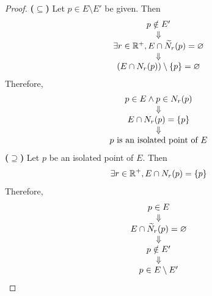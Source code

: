 \begin{proof}
    \textbf{($\subseteq$)} Let $p \in E \setminus E'$ be given. Then
    \[
    \begin{array}{c}
        p \notin E' \\
        \Downarrow \\
        \exists r \in \R^{+}, E \cap \widetilde{N}_{r}(p) = \vnot \\
        \Downarrow \\
        \paren*{E \cap N_{r}(p)} \setminus \set*{p} = \vnot
    \end{array}
    \]
    Therefore,
    \[
    \begin{array}{c}
        p \in E \land p \in N_{r}(p) \\
        \Downarrow \\
        E \cap N_{r}(p) = \set*{p} \\
        \Downarrow \\
        p \text{ is an isolated point of } E
    \end{array}
    \]
    \textbf{($\supseteq$)} Let $p$ be an isolated point of $E$. Then
    \[
    \exists r \in \R^{+}, E \cap N_{r}(p) = \set*{p}
    \]
    Therefore,
    \[
    \begin{array}{c}
        p \in E \\
        \Downarrow \\
        E \cap \widetilde{N}_{r}(p) = \vnot \\
        \Downarrow \\
        p \notin E' \\
        \Downarrow \\
        p \in E \setminus E'
    \end{array}
    \]
\end{proof}
